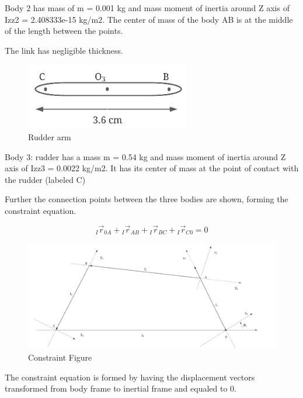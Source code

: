 Body 2 has mass of m = 0.001 kg and mass moment of inertia around Z axis of Izz2 = 2.408333e-15  kg/m2. The center of mass of the body AB is at the middle of the length between the points. 

The link has negligible thickness.

\begin{figure}
\includegraphics[width=0.9\linewidth]{graphics/Body2.png}
\caption{Rudder arm}
\label{fig:wrapfig}
\end{figure}

Body 3: rudder has a mass m = 0.54 kg and mass moment of inertia around Z axis of Izz3 = 0.0022 kg/m2. 
It has its center of mass at the point of contact with the rudder (labeled C)
 
 Further the connection points between the three bodies are shown, forming the constraint equation. 

\begin{equation}\label{constraint}
_I\vec{r}_{0A} + {_I}\vec{r}_{AB}+{_I}\vec{r}_{BC}+{_I}\vec{r}_{C0}=0
\end{equation}

 
 \begin{figure}[h!]
  \includegraphics[scale=0.55]{graphics/ConstraintFigure.png}
  \caption{Constraint Figure}
  \label{fig:Constraint Figure}
\end{figure}
 
The constraint equation is formed by having the displacement vectors transformed from body frame to inertial frame and equaled to 0. 

